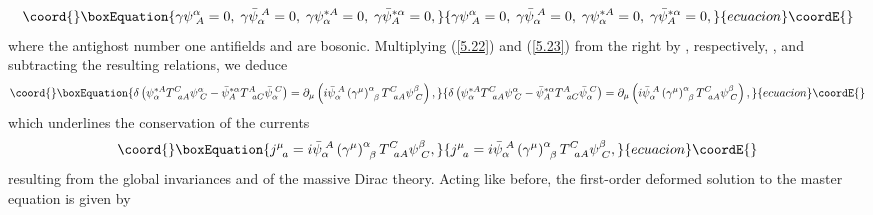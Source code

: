 \documentclass[a4paper,12pt]{article}
\begin{document}
\begin{equation}\coord{}\boxEquation{
\gamma \psi _{\;A}^{\alpha }=0,\;\gamma 
\bar{\psi}_{\alpha
}^{\;A}=0,\;\gamma \psi _{\alpha }^{*A}=
0,\;\gamma \bar{\psi}_{A}^{*\alpha
}=0,  \label{5.24}
}{
\gamma \psi _{\;A}^{\alpha }=0,\;\gamma 
\bar{\psi}_{\alpha
}^{\;A}=0,\;\gamma \psi _{\alpha }^{*A}=
0,\;\gamma \bar{\psi}_{A}^{*\alpha
}=0,  }{ecuacion}\coordE{}\end{equation}
where the antighost number one antifields
\coordHE{} and \coordHE{} are bosonic.
Multiplying (\ref{5.22}) and (\ref{5.23})
from the right by \coordHE{},
respectively, \coordHE{},
and subtracting the resulting
relations, we deduce
\begin{equation}\coord{}\boxEquation{
\delta \left( \psi _{\alpha }^{*A}T_{\;\;aA}^{C}
\psi _{\;C}^{\alpha }-\bar{
\psi}_{A}^{*\alpha }T_{\;\;aC}^{A}
\bar{\psi}_{\alpha }^{\;C}\right)
=\partial _{\mu }\left( 
i\bar{\psi}_{\alpha }^{\;A}\left( \gamma ^{\mu
}\right) _{\;\;\beta }^{\alpha }
T_{\;\;aA}^{C}\psi _{\;C}^{\beta }\right) ,
\label{5.25}
}{
\delta \left( \psi _{\alpha }^{*A}T_{\;\;aA}^{C}
\psi _{\;C}^{\alpha }-\bar{
\psi}_{A}^{*\alpha }T_{\;\;aC}^{A}
\bar{\psi}_{\alpha }^{\;C}\right)
=\partial _{\mu }\left( 
i\bar{\psi}_{\alpha }^{\;A}\left( \gamma ^{\mu
}\right) _{\;\;\beta }^{\alpha }
T_{\;\;aA}^{C}\psi _{\;C}^{\beta }\right) ,
}{ecuacion}\coordE{}\end{equation}
which underlines the conservation of the currents
\begin{equation}\coord{}\boxEquation{
j_{\;\;a}^{\mu }=
i\bar{\psi}_{\alpha }^{\;A}\left( \gamma ^{\mu }\right)
_{\;\;\beta }^{\alpha }T_{\;\;aA}^{C}
\psi _{\;C}^{\beta },  \label{5.26}
}{
j_{\;\;a}^{\mu }=
i\bar{\psi}_{\alpha }^{\;A}\left( \gamma ^{\mu }\right)
_{\;\;\beta }^{\alpha }T_{\;\;aA}^{C}
\psi _{\;C}^{\beta },  }{ecuacion}\coordE{}\end{equation}
resulting from the global invariances
\coordHE{} and \coordHE{} of the
massive Dirac theory. Acting like before,
the first-order deformed solution
to the master equation is given by
\end{document}
